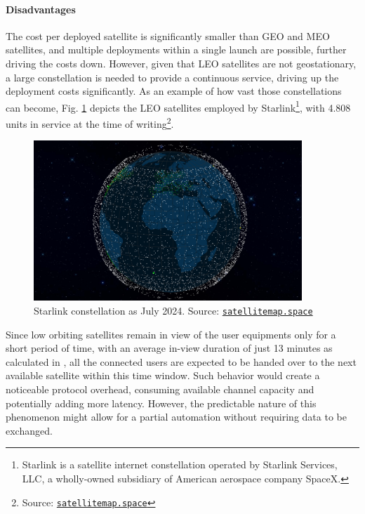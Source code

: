 \paragraph{Disadvantages}
The cost per deployed satellite is significantly smaller than \ac{GEO} and \ac{MEO} satellites, and multiple deployments within a single launch are possible, further driving the costs down. However, given that \ac{LEO} satellites are not geostationary, a large constellation is needed to provide a continuous service, driving up the deployment costs significantly. As an example of how vast those constellations can become, Fig. \ref{fig:starlink_constellation} depicts the \ac{LEO} satellites employed by Starlink\footnote{Starlink is a satellite internet constellation operated by Starlink Services, LLC, a wholly-owned subsidiary of American aerospace company SpaceX.}, with 4.808 units in service at the time of writing\footnote{Source: \href{https://satellitemap.space/}{\texttt{satellitemap.space}}}.

\begin{figure}[ht]
    \centering
    \includegraphics[width=0.9\textwidth]{res/starlink-constellation.png}
    \caption{Starlink constellation as July 2024. Source: \href{https://satellitemap.space/}{\texttt{satellitemap.space}}}
    \label{fig:starlink_constellation}
\end{figure}

Since low orbiting satellites remain in view of the user equipments only for a short period of time, with an average in-view duration of just 13 minutes as calculated in \cite{regional-coverage-analysis-leo}, all the connected users are expected to be handed over to the next available satellite within this time window. Such behavior would create a noticeable protocol overhead, consuming available channel capacity and potentially adding more latency. However, the predictable nature of this phenomenon might allow for a partial automation without requiring data to be exchanged.

